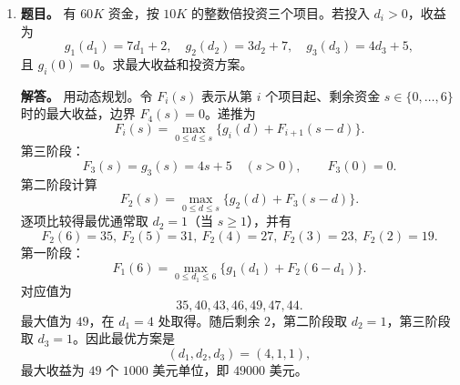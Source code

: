 ﻿\documentclass[UTF8,12pt]{ctexart}
\begin{document}
\begin{enumerate}[label=\textbf{\arabic*.},leftmargin=2.2em]
\item \textbf{题目。} 有 \(60K\) 资金，按 \(10K\) 的整数倍投资三个项目。若投入 \(d_i>0\)，收益为
\[
g_1(d_1)=7d_1+2,\quad g_2(d_2)=3d_2+7,\quad g_3(d_3)=4d_3+5,
\]
且 \(g_i(0)=0\)。求最大收益和投资方案。

\textbf{解答。} 用动态规划。令 \(F_i(s)\) 表示从第 \(i\) 个项目起、剩余资金 \(s\in\{0,\ldots,6\}\) 时的最大收益，边界 \(F_4(s)=0\)。递推为
\[
F_i(s)=\max_{0\le d\le s}\{g_i(d)+F_{i+1}(s-d)\}.
\]
第三阶段：
\[
F_3(s)=g_3(s)=4s+5\quad(s>0),\qquad F_3(0)=0.
\]
第二阶段计算
\[
F_2(s)=\max_{0\le d\le s}\{g_2(d)+F_3(s-d)\}.
\]
逐项比较得最优通常取 \(d_2=1\)（当 \(s\ge1\)），并有
\[
F_2(6)=35,\ F_2(5)=31,\ F_2(4)=27,\ F_2(3)=23,\ F_2(2)=19.
\]
第一阶段：
\[
F_1(6)=\max_{0\le d_1\le6}\{g_1(d_1)+F_2(6-d_1)\}.
\]
对应值为
\[
35,40,43,46,49,47,44.
\]
最大值为 \(49\)，在 \(d_1=4\) 处取得。随后剩余 \(2\)，第二阶段取 \(d_2=1\)，第三阶段取 \(d_3=1\)。因此最优方案是
\[
(d_1,d_2,d_3)=(4,1,1),
\]
最大收益为 \(49\) 个 \(1000\) 美元单位，即 \(49000\) 美元。
\end{enumerate}
\end{document}

